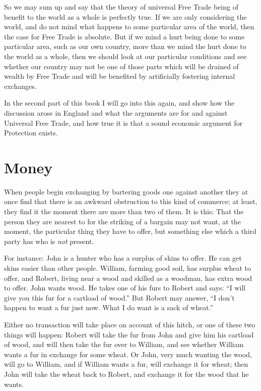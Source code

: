 \documentclass{book}
\begin{document}
So we may sum up and say that the theory of universal Free Trade being of benefit to the world as a whole is perfectly true. If we are only considering the world, and do not mind what happens to some particular area of the world, then the case for Free Trade is absolute. But if we mind a hurt being done to some particular area, such as our own country, more than we mind the hurt done to the world as a whole, then we should look at our particular conditions and see whether our country may not be one of those parts which will be drained of wealth by Free Trade and will be benefited by artificially fostering internal exchanges.

In the second part of this book I will go into this again, and show how the discussion arose in England and what the arguments are for and against Universal Free Trade, and how true it is that a sound economic argument for Protection exists.

\chapter{Money}
\label{chapter-7}
When people begin exchanging by bartering goods one against another they at once find that there is an awkward obstruction to this kind of commerce; at least, they find it the moment there are more than two of them. It is this: That the person they are nearest to for the striking of a bargain may not want, at the moment, the particular thing they have to offer, but something else which a third party has who is \emph{not} present.

For instance: John is a hunter who has a surplus of skins to offer. He can get skins easier than other people. William, farming good soil, has surplus wheat to offer, and Robert, living near a wood and skilled as a woodman, has extra wood to offer. John wants wood. He takes one of his furs to Robert and says: “I will give you this fur for a cartload of wood.” But Robert may answer, “I don’t happen to want a fur just now. What I do want is a sack of wheat.”

Either no transaction will take place on account of this hitch, or one of these two things will happen: Robert will take the fur from John and give him his cartload of wood, and will then take the fur over to William, and see whether William wants a fur in exchange for some wheat. Or John, very much wanting the wood, will go to William, and if William wants a fur, will exchange it for wheat; then John will take the wheat back to Robert, and exchange it for the wood that he wants.
\end{document}
